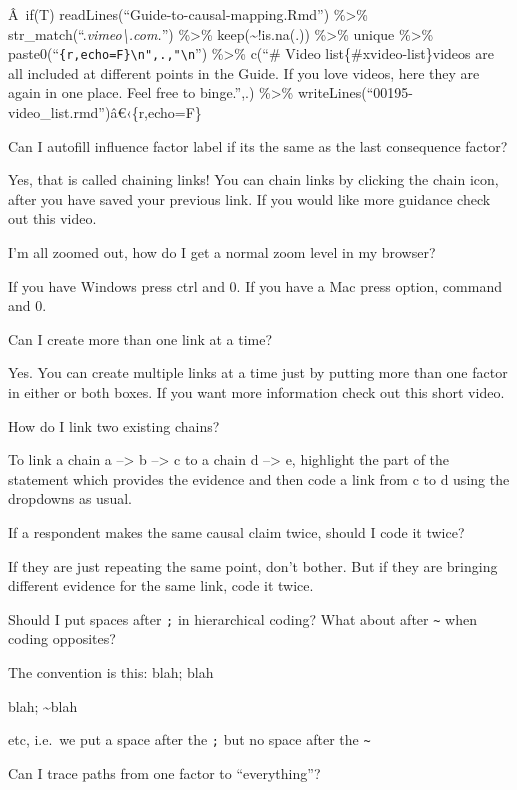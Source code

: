 \documentclass[
]{book}
\begin{document}
Â~if(T) readLines(``Guide-to-causal-mapping.Rmd'') \%\textgreater\% str\_match(``.\emph{vimeo\textbackslash.com.}'') \%\textgreater\% keep(\textasciitilde!is.na(.)) \%\textgreater\% unique \%\textgreater\% paste0(``\texttt{\{r,echo=F\}\textbackslash{}n",.,"\textbackslash{}n}\n'') \%\textgreater\% c(``\# Video list\{\#xvideo-list\}\n\nThese videos are all included at different points in the Guide. If you love videos, here they are again in one place. Feel free to binge.'',.) \%\textgreater\% writeLines(``00195-video\_list.rmd'')â€‹\{r,echo=F\}

Can I autofill influence factor label if its the same as the last consequence factor?

Yes, that is called chaining links! You can chain links by clicking the chain icon, after you have saved your previous link. If you would like more guidance check out this video.

I'm all zoomed out, how do I get a normal zoom level in my browser?

If you have Windows press ctrl and 0. If you have a Mac press option, command and 0.

Can I create more than one link at a time?

Yes. You can create multiple links at a time just by putting more than one factor in either or both boxes. If you want more information check out this short video.

How do I link two existing chains?

To link a chain a --\textgreater{} b --\textgreater{} c to a chain d --\textgreater{} e, highlight the part of the statement which provides the evidence and then code a link from c to d using the dropdowns as usual.

If a respondent makes the same causal claim twice, should I code it twice?

If they are just repeating the same point, don't bother. But if they are bringing different evidence for the same link, code it twice.

Should I put spaces after \texttt{;} in hierarchical coding? What about after \texttt{\textasciitilde{}} when coding opposites?

The convention is this: blah; blah

blah; \textasciitilde blah

etc, i.e.~we put a space after the \texttt{;} but no space after the \texttt{\textasciitilde{}}

Can I trace paths from one factor to ``everything''?
\end{document}
